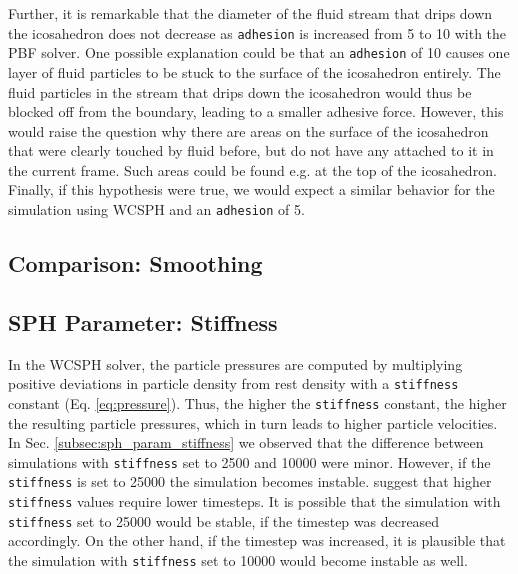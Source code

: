 \documentclass[11pt, letterpaper, twocolumn]{article}
\begin{document}
Further, it is remarkable that the diameter of the fluid stream that drips down the icosahedron does not decrease as \texttt{adhesion} is increased from 5 to 10 with the PBF solver. One possible explanation could be that an \texttt{adhesion} of 10 causes one layer of fluid particles to be stuck to the surface of the icosahedron entirely. The fluid particles
in the stream that drips down the icosahedron would thus be blocked off from the boundary, leading to a smaller adhesive force. However, this would raise the question why there are areas on the surface of the icosahedron that were clearly touched by fluid before, but do not have any attached to it in the current frame. Such areas could be found e.g. at the top
of the icosahedron. Finally, if this hypothesis were true, we would expect a similar behavior for the simulation using WCSPH and an \texttt{adhesion} of 5.

\subsection{Comparison: Smoothing}

\subsection{SPH Parameter: Stiffness}
In the WCSPH solver, the particle pressures are computed by multiplying positive deviations in particle density from rest density with a \texttt{stiffness} constant (Eq. \ref{eq:pressure}). Thus, the higher the \texttt{stiffness} constant, the higher the resulting particle pressures, which in turn leads
to higher particle velocities. In Sec. \ref{subsec:sph_param_stiffness} we observed that the difference between simulations with \texttt{stiffness} set to 2500 and 10000 were minor. However, if the \texttt{stiffness} is set to 25000 the simulation becomes instable. \cite{solenthaler09} suggest that 
higher \texttt{stiffness} values require lower timesteps. It is possible that the simulation with \texttt{stiffness} set to 25000 would be stable, if the timestep was decreased accordingly. On the other hand, if the timestep was increased, it is plausible that the simulation with \texttt{stiffness} set 
to 10000 would become instable as well.
\end{document}
